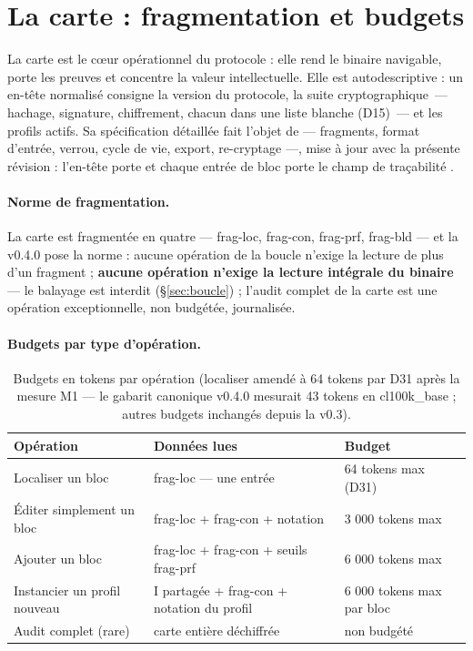 \section{La carte : fragmentation et budgets}\label{sec:carte}

\begin{sloppypar}
La carte est le cœur opérationnel du protocole : elle rend le binaire navigable, porte les
preuves et concentre la valeur intellectuelle. Elle est autodescriptive : un en-tête
normalisé consigne la version du protocole, la suite cryptographique~— hachage, signature,
chiffrement, chacun dans une liste blanche (D15)~— et les profils actifs. Sa spécification
détaillée fait l’objet de  — fragments, format d’entrée, verrou,
cycle de vie, export, re-cryptage —, mise à jour avec la présente révision : l’en-tête
porte  et chaque entrée de bloc porte le champ de traçabilité
.
\end{sloppypar}

\paragraph{Norme de fragmentation.} La carte est fragmentée en quatre — frag-loc, frag-con,
frag-prf, frag-bld — et la v0.4.0 pose la norme : aucune opération de la boucle n’exige la
lecture de plus d’un fragment ; \textbf{aucune opération n’exige la lecture intégrale du
binaire} — le balayage est interdit (§\ref{sec:boucle}) ; l’audit complet de la carte est
une opération exceptionnelle, non budgétée, journalisée.

\paragraph{Budgets par type d’opération.}

\begin{table}[htbp]
\centering\small
\caption{Budgets en tokens par opération (localiser amendé à 64 tokens par D31 après la mesure M1 — le gabarit canonique v0.4.0 mesurait 43 tokens en cl100k\_base ; autres budgets inchangés depuis la v0.3).}
\label{tab:budgets}
\begin{tabularx}{\textwidth}{@{}Y Y l@{}}
\toprule
\textbf{Opération} & \textbf{Données lues} & \textbf{Budget} \\
\midrule
Localiser un bloc & frag-loc — une entrée & 64 tokens max (D31) \\
Éditer simplement un bloc & frag-loc + frag-con + notation & 3 000 tokens max \\
Ajouter un bloc & frag-loc + frag-con + seuils frag-prf & 6 000 tokens max \\
Instancier un profil nouveau & I partagée + frag-con + notation du profil & 6 000 tokens
max par bloc \\
Audit complet (rare) & carte entière déchiffrée & non budgété \\
\bottomrule
\end{tabularx}
\end{table}

